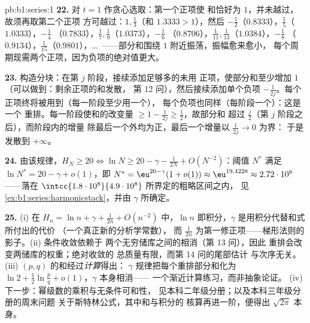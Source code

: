 \begin{solution}{pb:b1:series:1}
\textbf{22.} 对 $t = 1$ 作贪心选取：第一个正项使
和恰好为 $1$，并未越过，故须再取第二个正项
方可越过：$1, \frac13$（和 $1.3333 > 1$），然后
$-\frac12$（$0.8333$），$\frac15$（$1.0333$），$-\frac14$
（$0.7833$），$\frac17, \frac19$（$1.0373$），$-\frac16$
（$0.8706$），$\frac1{11}, \frac1{13}$（$1.0384$），$-\frac18$
（$0.9134$），$\frac1{15}$（$0.9801$），\dots\ ——部分和围绕
$1$ 附近振荡，振幅愈来愈小，
每个周期现需两个正项，因为负项的绝对值更大。

\textbf{23.} 构造分块：在第 $j$ 阶段，接续添加足够多的未用
正项，使部分和至少增加 $1$
（可以做到：剩余正项的和发散，
第 12 问），然后接续添加单个负项 $-\frac{1}
{2j}$。每个正项终将被用到（每一阶段至少用一个），
每个负项也同样（每阶段一个）：这是一个
重排。每一阶段使和的改变量 $\geq 1 -
\frac{1}{2j} \geq \frac12$，故部分和
超过 $\frac{j}{2}$（第 $j$ 阶段之后），而阶段内的增量
除最后一个外均为正，最后一个增量以 $\frac{1}{2j} \to 0$ 为界：
于是发散到 $+\infty$。

\textbf{24.} 由该规律，$H_N \geq 20 \iff \ln N \geq 20 -
\gamma - \frac{1}{2N} + O(N^{-2})$：阈值 $N^*$
满足 $\ln N^* = 20 - \gamma + o(1)$，即 $N^* =
\eu^{20 - \gamma}(1 + o(1)) \approx \eu^{19.4228} \approx
2.72\cdot10^{8}$ ——落在
$\intcc{1.8\cdot10^8}{4.9\cdot10^8}$ 所界定的粗略区间之内，
见 \cref{ex:b1:series:harmonicstack}，并由 $\gamma$ 所确定。

\textbf{25.} (i) 在 $H_n = \ln n + \gamma + \frac{1}{2n} +
O(n^{-2})$ 中，$\ln n$ 即积分，$\gamma$ 是用积分代替和式所付出的代价
（一个真正新的分析学常数），
而 $\frac{1}{2n}$ 为第一修正项——梯形法则的
影子。(ii) 条件收敛依赖于
两个无穷储库之间的相消（第 13 问），因此
重排会改变两储库的权重；绝对收敛的
总质量有限，而第 14 问的尾部估计
与次序无关。(iii) $(p,q)$ 的和经过\emph{计算}得出：
$\gamma$ 规律把每个重排部分和化为 $\ln 2 +
\frac12\ln\frac pq + o(1)$，$\gamma$ 本身相消——
一个渐近计算练习，而非抽象论证。
(iv) 下一步：幂级数的乘积与无条件可和性，
见本科二年级分册；以及本科三年级分册的周末问题
关于斯特林公式，其中和与积分的
核算再进一阶，便得出 $\sqrt{2\pi}$
本身。
\end{solution}
